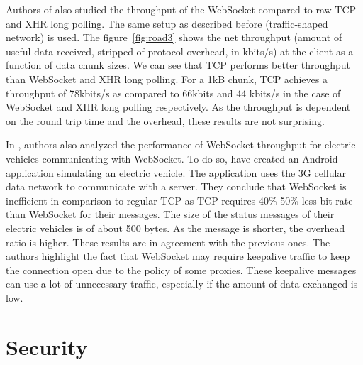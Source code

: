 \documentclass[10pt,journal,compsoc]{IEEEtran}
\newcommand{\ws}{WebSocket}
\begin{document}
Authors of \cite{roadblock} also studied the throughput of the \ws{} compared to raw TCP and XHR long polling.
The same setup as described before (traffic-shaped network) is used.
The figure~\ref{fig:road3} shows the net throughput (amount of useful data received, stripped of protocol overhead, in kbits/s) at the client as a function of data chunk sizes.
We can see that TCP performs better throughput than \ws{} and XHR long polling.
For a 1kB chunk, TCP achieves a throughput of 78kbits/s as compared to 66kbits and 44 kbits/s in the case of \ws{} and XHR long polling respectively.
As the throughput is dependent on the round trip time and the overhead, these results are not surprising.

In \cite{EV}, authors also analyzed the performance of \ws{} throughput for electric vehicles communicating with \ws{}.
To do so, \cite{EV} have created an Android application simulating an electric vehicle.
The application uses the 3G cellular data network to communicate with a server.
They conclude that \ws{} is inefficient in comparison to regular TCP as TCP requires 40\%-50\% less bit rate than \ws{} for their messages.
The size of the status messages of their electric vehicles is of about 500 bytes.
As the message is shorter, the overhead ratio is higher.
These results are in agreement with the previous ones.
The authors highlight the fact that \ws{} may require keepalive traffic to keep the connection open due to the policy of some proxies. %
These keepalive messages can use a lot of unnecessary traffic, especially if the amount of data exchanged is low. %


\section{Security}
\end{document}
